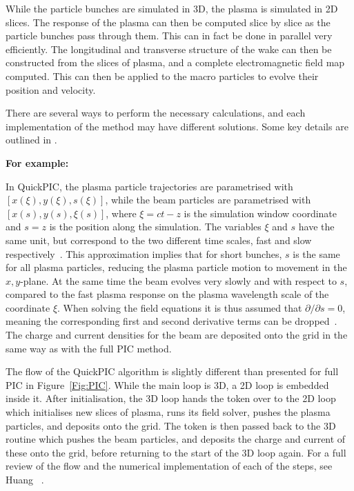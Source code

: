 While the particle bunches are simulated in 3D, the plasma is simulated in 2D slices.
The response of the plasma can then be computed slice by slice as the particle bunches pass through them.
This can in fact be done in parallel very efficiently.
The longitudinal and transverse structure of the wake can then be constructed from the slices of plasma, and a complete electromagnetic field map computed.
This can then be applied to the macro particles to evolve their position and velocity.

There are several ways to perform the necessary calculations, and each implementation of the method may have different solutions.
Some key details are outlined in \cite{vay:2016}.

\bigskip
\noindent\textbf{For example:}
\bigskip

In QuickPIC, the plasma particle trajectories are parametrised with $[x(\xi), y(\xi), s(\xi)]$, while the beam particles are parametrised with $[x(s),y(s),\xi(s)]$, where $\xi = ct - z$ is the simulation window coordinate and $s=z$ is the position along the simulation.
The variables $\xi$ and $s$ have the same unit, but correspond to the two different time scales, fast and slow respectively~\cite{huang:2006}.
This approximation implies that for short bunches, $s$ is the same for all plasma particles, reducing the plasma particle motion to movement in the $x,y$-plane.
At the same time the beam evolves very slowly and with respect to $s$, compared to the fast plasma response on the plasma wavelength scale of the coordinate $\xi$.
When solving the field equations it is thus assumed that $\partial/\partial s = 0$, meaning the corresponding first and second derivative terms can be dropped~\cite{an:2013}.
The charge and current densities for the beam are deposited onto the grid in the same way as with the full PIC method.

The flow of the QuickPIC algorithm is slightly different than presented for full PIC in Figure~\ref{Fig:PIC}.
While the main loop is 3D, a 2D loop is embedded inside it.
After initialisation, the 3D loop hands the token over to the 2D loop which initialises new slices of plasma, runs its field solver, pushes the plasma particles, and deposits onto the grid.
The token is then passed back to the 3D routine which pushes the beam particles, and deposits the charge and current of these onto the grid, before returning to the start of the 3D loop again.
For a full review of the flow and the numerical implementation of each of the steps, see Huang \etal~\cite{huang:2006}.

